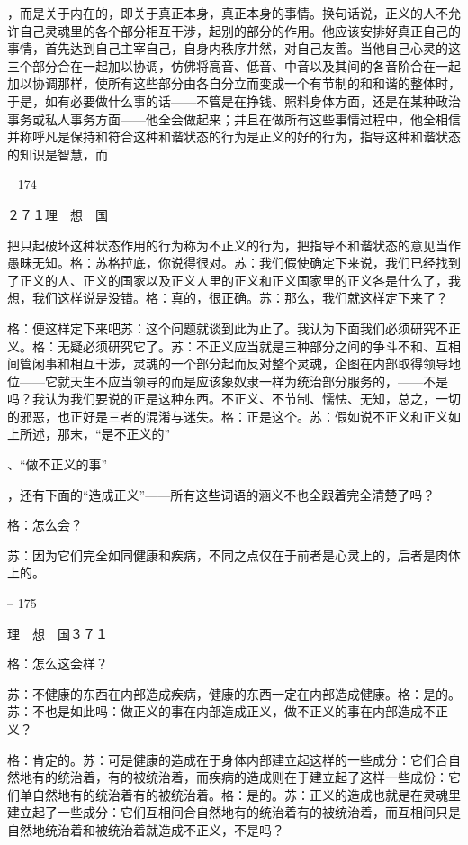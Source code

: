 \documentclass[11pt,oneside]{book}
\begin{document}
\begin{common-format}
    ，而是关于内在的，即关于真正本身，真正本身的事情。换句话说，正义的人不允许自己灵魂里的各个部分相互干涉，起别的部分的作用。他应该安排好真正自己的事情，首先达到自己主宰自己，自身内秩序井然，对自己友善。当他自己心灵的这三个部分合在一起加以协调，仿佛将高音、低音、中音以及其间的各音阶合在一起加以协调那样，使所有这些部分由各自分立而变成一个有节制的和和谐的整体时，于是，如有必要做什么事的话——不管是在挣钱、照料身体方面，还是在某种政治事务或私人事务方面——他全会做起来；并且在做所有这些事情过程中，他全相信并称呼凡是保持和符合这种和谐状态的行为是正义的好的行为，指导这种和谐状态的知识是智慧，而

    

-- 174

    ２７１理　想　国

    把只起破坏这种状态作用的行为称为不正义的行为，把指导不和谐状态的意见当作愚昧无知。格：苏格拉底，你说得很对。苏：我们假使确定下来说，我们已经找到了正义的人、正义的国家以及正义人里的正义和正义国家里的正义各是什么了，我想，我们这样说是没错。格：真的，很正确。苏：那么，我们就这样定下来了？

    格：便这样定下来吧苏：这个问题就谈到此为止了。我认为下面我们必须研究不正义。格：无疑必须研究它了。苏：不正义应当就是三种部分之间的争斗不和、互相间管闲事和相互干涉，灵魂的一个部分起而反对整个灵魂，企图在内部取得领导地位——它就天生不应当领导的而是应该象奴隶一样为统治部分服务的，——不是吗？我认为我们要说的正是这种东西。不正义、不节制、懦怯、无知，总之，一切的邪恶，也正好是三者的混淆与迷失。格：正是这个。苏：假如说不正义和正义如上所述，那末，“是不正义的”

    、“做不正义的事”

    ，还有下面的“造成正义”——所有这些词语的涵义不也全跟着完全清楚了吗？

    格：怎么会？

    苏：因为它们完全如同健康和疾病，不同之点仅在于前者是心灵上的，后者是肉体上的。

    

-- 175

    理　想　国３７１

    格：怎么这会样？

    苏：不健康的东西在内部造成疾病，健康的东西一定在内部造成健康。格：是的。苏：不也是如此吗：做正义的事在内部造成正义，做不正义的事在内部造成不正义？

    格：肯定的。苏：可是健康的造成在于身体内部建立起这样的一些成分：它们合自然地有的统治着，有的被统治着，而疾病的造成则在于建立起了这样一些成份：它们单自然地有的统治着有的被统治着。格：是的。苏：正义的造成也就是在灵魂里建立起了一些成分：它们互相间合自然地有的统治着有的被统治着，而互相间只是自然地统治着和被统治着就造成不正义，不是吗？


\end{common-format}
\end{document}
